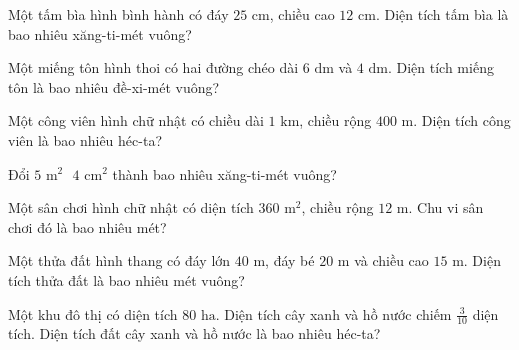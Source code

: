 \begin{ex}
  Một tấm bìa hình bình hành có đáy $25\text{ cm}$, chiều cao $12\text{ cm}$. Diện tích tấm bìa là bao nhiêu xăng-ti-mét vuông?
\end{ex}

\begin{ex}
  Một miếng tôn hình thoi có hai đường chéo dài $6\text{ dm}$ và $4\text{ dm}$. Diện tích miếng tôn là bao nhiêu đề-xi-mét vuông?
\end{ex}

\begin{ex}
  Một công viên hình chữ nhật có chiều dài $1\text{ km}$, chiều rộng $400\text{ m}$. Diện tích công viên là bao nhiêu héc-ta?
\end{ex}

\begin{ex}
  Đổi $5\text{ m}^2\text{ } 4\text{ cm}^2$ thành bao nhiêu xăng-ti-mét vuông?
\end{ex}

\begin{ex}
  Một sân chơi hình chữ nhật có diện tích $360\text{ m}^2$, chiều rộng $12\text{ m}$. Chu vi sân chơi đó là bao nhiêu mét?
\end{ex}

\begin{ex}
  Một thửa đất hình thang có đáy lớn $40\text{ m}$, đáy bé $20\text{ m}$ và chiều cao $15\text{ m}$. Diện tích thửa đất là bao nhiêu mét vuông?
\end{ex}

\begin{ex}
  Một khu đô thị có diện tích $80\text{ ha}$. Diện tích cây xanh và hồ nước chiếm $\frac{3}{10}$ diện tích. Diện tích đất cây xanh và hồ nước là bao nhiêu héc-ta?
\end{ex}

